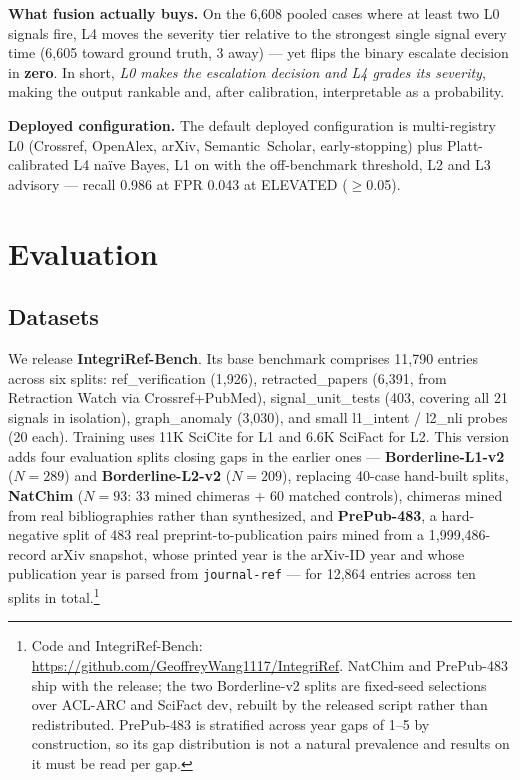 \documentclass[letterpaper]{article} %
\begin{document}
\noindent\textbf{What fusion actually buys.} On the 6{,}608 pooled cases where at least two L0 signals fire, L4 moves the severity tier relative to the strongest single signal every time (6{,}605 toward ground truth, 3 away) --- yet flips the binary escalate decision in \textbf{zero}. In short, \emph{L0 makes the escalation decision and L4 grades its severity}, making the output rankable and, after calibration, interpretable as a probability.

\noindent\textbf{Deployed configuration.} The default deployed configuration is multi-registry L0 (Crossref, OpenAlex, arXiv, Semantic~Scholar, early-stopping) plus Platt-calibrated L4 na\"ive Bayes, L1 on with the off-benchmark threshold, L2 and L3 advisory --- recall 0.986 at FPR 0.043 at ELEVATED ($\geq$0.05).

\section{Evaluation}

\subsection{Datasets}
\label{ssec:datasets}

We release \textbf{IntegriRef-Bench}. Its base benchmark comprises 11{,}790 entries across six splits: ref\_verification (1{,}926), retracted\_papers (6{,}391, from Retraction Watch via Crossref+PubMed), signal\_unit\_tests (403, covering all 21 signals in isolation), graph\_anomaly (3{,}030), and small l1\_intent / l2\_nli probes (20 each). Training uses 11K SciCite \cite{cohan2019structural} for L1 and 6.6K SciFact \cite{wadden2020fact} for L2. This version adds four evaluation splits closing gaps in the earlier ones --- \textbf{Borderline-L1-v2} ($N{=}289$) and \textbf{Borderline-L2-v2} ($N{=}209$), replacing 40-case hand-built splits, \textbf{NatChim} ($N{=}93$: 33 mined chimeras + 60 matched controls), chimeras mined from real bibliographies rather than synthesized, and \textbf{PrePub-483}, a hard-negative split of 483 real preprint-to-publication pairs mined from a 1{,}999{,}486-record arXiv snapshot, whose printed year is the arXiv-ID year and whose publication year is parsed from \texttt{journal-ref} --- for 12{,}864 entries across ten splits in total.\footnote{Code and IntegriRef-Bench: \url{https://github.com/GeoffreyWang1117/IntegriRef}. NatChim and PrePub-483 ship with the release; the two Borderline-v2 splits are fixed-seed selections over ACL-ARC and SciFact dev, rebuilt by the released script rather than redistributed. PrePub-483 is stratified across year gaps of 1--5 by construction, so its gap distribution is not a natural prevalence and results on it must be read per gap.}
\end{document}
